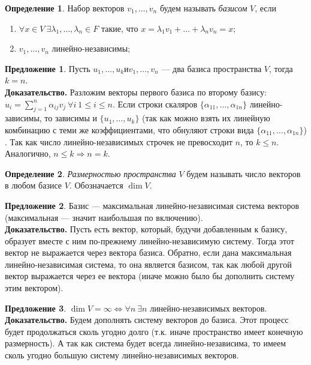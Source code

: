 \documentclass[a4paper]{article}
\theoremstyle{definition}
\newtheorem{fact}{Предложение}
\newtheorem{definition}{Определение}
\begin{document}
\begin{definition}
	Набор векторов $v_1, \dots, v_n$ будем называть \textit{базисом} $V$, если 
	\begin{enumerate}
		\item $\forall x \in V \ \exists \lambda_1, \dots, \lambda_n \in F$ такие, что $x = \lambda_1v_1 + \dots + \lambda_nv_n = x$;
		\item $v_1, \dots, v_n$ линейно-независимы;
	\end{enumerate}
\end{definition}

\begin{fact}
	Пусть ${u_1, \dots, u_k} и {v_1, \dots, v_n}$ --- два базиса пространства $V$, тогда $k = n$. 
	\\
	 \textbf{Доказательство.} Разложим векторы первого базиса по второму базису: $u_i = \sum \limits_{j = 1}^n \alpha_{ij} v_j  \ \forall i \ 1 \leq i \leq n$. Если строки скаляров $\{\alpha_{11}, \dots, \alpha_{1n}\} $ линейно-зависимы, то зависимы и $\{u_1, \dots, u_k\}$ (так как можно взять их линейную комбинацию с теми же коэффициентами, что обнуляют строки вида $\{\alpha_{11}, \dots, \alpha_{1n}\}$) . Так как число линейно-независимых строчек не превосходит $n$, то $k \leq n$. Аналогично, $n \leq k \Rightarrow n = k$. \qedsymbol
\end{fact}

\begin{definition}
	\textit{Размерностью пространства} $V$ будем называть число векторов в любом базисе $V$. Обозначается $\dim V$.
\end{definition}

\begin{fact}
	Базис --- максимальная линейно-независимая система векторов (максимальная --- значит наибольшая по включению).
	\\
	\textbf{Доказательство.} Пусть есть вектор, который, будучи добавленным к базису, образует вместе с ним по-прежнему линейно-независимую систему. Тогда этот вектор не выражается через вектора базиса. Обратно, если дана максимальная линейно-независимая система, то она является базисом, так как любой другой вектор выражается через ее вектора (иначе можно было бы дополнить систему этим вектором). \qedsymbol
\end{fact}
\newpage
\begin{fact}
	$\dim V = \infty \Leftrightarrow \forall n \ \exists n$ линейно-независимых векторов.
	\\
	\textbf{Доказательство.} Будем дополнять систему векторов до базиса. Этот процесс будет продолжаться сколь угодно долго (т.к. иначе пространство имеет конечную размерность). А так как система будет всегда линейно-независима, то имеем сколь угодно большую систему линейно-независимых векторов. \qedsymbol
\end{fact}
\end{document}
